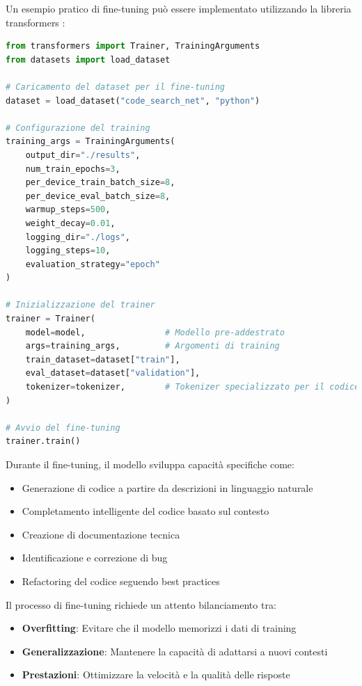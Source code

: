 \documentclass[12pt,a4paper,openright,twoside]{book}
\begin{document}
Un esempio pratico di fine-tuning può essere implementato utilizzando la libreria transformers \cite{huggingface-transformers}:

\begin{lstlisting}[language=Python]
from transformers import Trainer, TrainingArguments
from datasets import load_dataset

# Caricamento del dataset per il fine-tuning
dataset = load_dataset("code_search_net", "python")

# Configurazione del training
training_args = TrainingArguments(
    output_dir="./results",
    num_train_epochs=3,
    per_device_train_batch_size=8,
    per_device_eval_batch_size=8,
    warmup_steps=500,
    weight_decay=0.01,
    logging_dir="./logs",
    logging_steps=10,
    evaluation_strategy="epoch"
)

# Inizializzazione del trainer
trainer = Trainer(
    model=model,                # Modello pre-addestrato
    args=training_args,         # Argomenti di training
    train_dataset=dataset["train"],
    eval_dataset=dataset["validation"],
    tokenizer=tokenizer,        # Tokenizer specializzato per il codice
)

# Avvio del fine-tuning
trainer.train()
\end{lstlisting}

Durante il fine-tuning, il modello sviluppa capacità specifiche come:
\begin{itemize}
    \item Generazione di codice a partire da descrizioni in linguaggio naturale
    \item Completamento intelligente del codice basato sul contesto
    \item Creazione di documentazione tecnica
    \item Identificazione e correzione di bug
    \item Refactoring del codice seguendo best practices
\end{itemize}

Il processo di fine-tuning richiede un attento bilanciamento tra:
\begin{itemize}
    \item \textbf{Overfitting}: Evitare che il modello memorizzi i dati di training
    \item \textbf{Generalizzazione}: Mantenere la capacità di adattarsi a nuovi contesti
    \item \textbf{Prestazioni}: Ottimizzare la velocità e la qualità delle risposte
\end{itemize}
\end{document}
